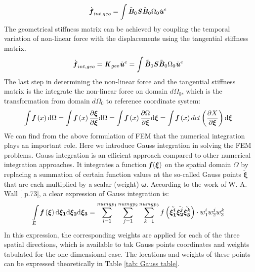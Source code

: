 \begin{equation}
\dot{\textbf{\textit{f}}}_{int,geo} = \int \tilde{\textbf{\textit{B}}}_0 \textbf{\textit{S}} \tilde{\textbf{\textit{B}}}_0 \mathrm{\Omega_0} \dot{\textbf{\textit{u}}}^e
\end{equation}
The geometrical stiffness matrix can be achieved by coupling the temporal variation of non-linear force with the displacements using the tangential stiffness matrix.
\begin{equation}
\dot{\textbf{\textit{f}}}_{int,geo} = \textbf{\textit{K}}_{geo} \dot{\textbf{\textit{u}}}^e =\int \tilde{\textbf{\textit{B}}}_0 \textbf{\textit{S}} \tilde{\textbf{\textit{B}}}_0 \mathrm{\Omega_0} \dot{\textbf{\textit{u}}}^e
\end{equation}
The last step in determining the non-linear force and the tangential stiffness matrix is the integrate the non-linear force on domain $d\Omega_0$, which is the transformation from domain $d\Omega_0$ to reference coordinate system:
\begin{equation}
\int {\textbf{\textit{f}}}\left(x\right) \mathrm{d}\Omega = \int {\textbf{\textit{f}}}\left(x\right) \frac{\partial \boldsymbol{\xi}}{\partial \boldsymbol{\xi}} \mathrm{d}\Omega = \int {\textbf{\textit{f}}}\left(x\right) \frac{\partial \Omega}{\partial \boldsymbol{\xi}} \mathrm{d}\boldsymbol{\xi} = \int {\textbf{\textit{f}}}\left(x\right) det \left(\frac{\partial X}{\partial \boldsymbol{\xi}}\right) \mathrm{d}\boldsymbol{\xi}
\end{equation}
We can find from the above formulation of FEM that the numerical integration plays an important role. Here we introduce Gauss integration in solving the FEM problems. Gauss integration is an efficient approach compared to other numerical integration approaches. It integrates a function $\textbf{\textit{f}}(\boldsymbol{\xi})$ on the spatial domain $\Omega$ by replacing a summation of certain function values at the so-called Gauss points $\tilde{\boldsymbol{\xi}}$ that are each multiplied by a scalar (weight) $\boldsymbol{\omega}$.  According to the work of W. A. Wall [\cite{FiniteElement} p.73], a clear expression of Gauss integration is:
\begin{equation}
\int \limits_E {\textbf{\textit{f}}} \left(\boldsymbol{\xi}\right) \mathrm{d\boldsymbol{\xi_1}}\mathrm{d\boldsymbol{\xi_2}}\mathrm{d\boldsymbol{\xi_3}} = \displaystyle\sum_{i=1}^{numgp_1}\displaystyle\sum_{j=1}^{numgp_2} \displaystyle\sum_{k=1}^{numgp_3} f\left(\tilde{\boldsymbol{\xi_1^i}}\tilde{\boldsymbol{\xi_2^j}}\tilde{\boldsymbol{\xi_3^k}}\right)\cdot w_1^i w_2^j w_3^k
\end{equation}
In this expression, the corresponding weights are applied for each of the three spatial directions, which is available to tak Gauss points coordinates and weights tabulated for the one-dimensional case. The locations and weights of these points can be expressed theoretically in Table \ref{tab: Gauss table}.
	
